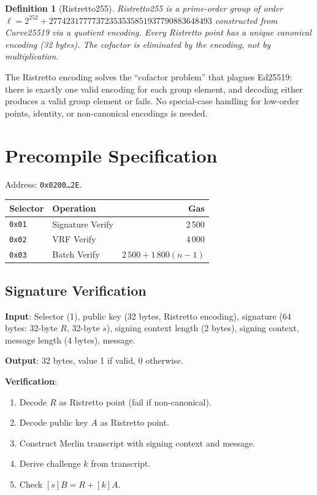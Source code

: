 \documentclass[11pt,a4paper]{article}
\newtheorem{definition}{Definition}
\begin{document}
\begin{definition}[Ristretto255]
Ristretto255 is a prime-order group of order $\ell = 2^{252} + 27742317777372353535851937790883648493$
constructed from Curve25519 via a quotient encoding. Every Ristretto point has
a unique canonical encoding (32 bytes). The cofactor is eliminated by the encoding,
not by multiplication.
\end{definition}

The Ristretto encoding solves the ``cofactor problem'' that plagues Ed25519:
there is exactly one valid encoding for each group element, and decoding
either produces a valid group element or fails. No special-case handling for
low-order points, identity, or non-canonical encodings is needed.

\section{Precompile Specification}

Address: \texttt{0x0200\ldots2E}.

\begin{table}[H]
\centering
\begin{tabular}{llr}
\toprule
\textbf{Selector} & \textbf{Operation} & \textbf{Gas} \\
\midrule
\texttt{0x01} & Signature Verify & 2\,500 \\
\texttt{0x02} & VRF Verify & 4\,000 \\
\texttt{0x03} & Batch Verify & $2\,500 + 1\,800(n-1)$ \\
\bottomrule
\end{tabular}
\end{table}

\subsection{Signature Verification}

\textbf{Input}: Selector (1), public key (32 bytes, Ristretto encoding),
signature (64 bytes: 32-byte $R$, 32-byte $s$), signing context length (2 bytes),
signing context, message length (4 bytes), message.

\textbf{Output}: 32 bytes, value 1 if valid, 0 otherwise.

\textbf{Verification}:
\begin{enumerate}
  \item Decode $R$ as Ristretto point (fail if non-canonical).
  \item Decode public key $A$ as Ristretto point.
  \item Construct Merlin transcript with signing context and message.
  \item Derive challenge $k$ from transcript.
  \item Check $[s]B = R + [k]A$.
\end{enumerate}
\end{document}
